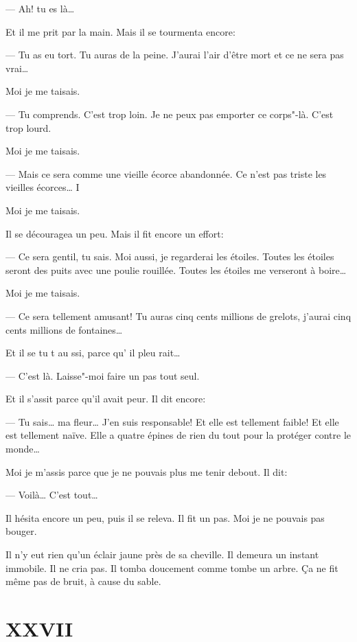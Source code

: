 \begin{Parallel}[p]{}{}
{--- Ah! tu es là\ldots{}

Et il me prit par la main. Mais il se tourmenta encore:

--- Tu as eu tort. Tu auras de la peine. J'aurai l'air d'être mort et ce ne
sera pas vrai\ldots{}

Moi je me taisais.

--- Tu comprends. C'est trop loin. Je ne peux pas emporter ce corps"-là. C'est
trop lourd.

Moi je me taisais.

--- Mais ce sera comme une vieille écorce abandonnée. Ce n'est pas triste les
vieilles écorces\ldots{} I

Moi je me taisais.

Il se découragea un peu. Mais il fit encore un effort:

--- Ce sera gentil, tu sais. Moi aussi, je regarderai les étoiles. Toutes les
étoiles seront des puits avec une poulie rouillée. Toutes les étoiles me
verseront à boire\ldots{}

Moi je me taisais.

--- Ce sera tellement amusant! Tu auras cinq cents millions de grelots, j'aurai
cinq cents millions de fontaines\ldots{}

Et il se tu t au ssi, parce qu’ il pleu rait\ldots{}

\medskip

--- C'est là. Laisse"-moi faire un pas tout seul.

Et il s'assit parce qu'il avait peur. Il dit encore:

--- Tu sais\ldots{} ma fleur\ldots{} J'en suis responsable! Et elle est tellement
faible! Et elle est tellement naïve. Elle a quatre épines de rien du tout pour
la protéger contre le monde\ldots{}

Moi je m'assis parce que je ne pouvais plus me tenir debout. Il dit:

--- Voilà\ldots{} C'est tout\ldots{}

Il hésita encore un peu, puis il se releva. Il fit un pas. Moi je ne pouvais pas
bouger.

Il n'y eut rien qu’un éclair jaune près de sa cheville. Il demeura un instant
immobile. Il ne cria pas. Il tomba doucement comme tombe un arbre. Ça ne fit même
pas de bruit, à cause du sable.

\section{XXVII}

}
\end{Parallel}
